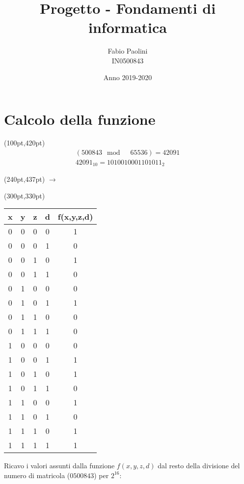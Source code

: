 \documentclass{article}
\newcommand{\bigspace}{\quad\quad\quad\quad}
\begin{document}
\author{Fabio Paolini\\ IN0500843}
\title{Progetto - Fondamenti di informatica}
\date{Anno 2019-2020}
\maketitle
\section{Calcolo della funzione}
\begin{textblock*}{10pt}(100pt,420pt)
\begin{gather*}
(500843 \mod \quad 65536) = 42091\\
42091_{10} = 1010010001101011_2
\end{gather*}
\end{textblock*}
\begin{textblock*}{10pt}(240pt,437pt)
\Huge{$\rightarrow$}
\end{textblock*}
\begin{textblock*}{10pt}(300pt,330pt)
\begin{tabular}{|c|c|c|c|c|}
\hline
\textbf{x} & \textbf{y} & \textbf{z} & \textbf{d} & \textbf{f(x,y,z,d)} \\
\hline
0 & 0 & 0 & 0 & 1 \\
\hline
0 & 0 & 0 & 1 & 0 \\
\hline
0 & 0 & 1 & 0 & 1 \\
\hline
0 & 0 & 1 & 1 & 0 \\
\hline
0 & 1 & 0 & 0 & 0 \\
\hline
0 & 1 & 0 & 1 & 1 \\
\hline
0 & 1 & 1 & 0 & 0 \\
\hline
0 & 1 & 1 & 1 & 0 \\
\hline
1 & 0 & 0 & 0 & 0 \\
\hline
1 & 0 & 0 & 1 & 1 \\
\hline
1 & 0 & 1 & 0 & 1 \\
\hline
1 & 0 & 1 & 1 & 0 \\
\hline
1 & 1 & 0 & 0 & 1 \\
\hline
1 & 1 & 0 & 1 & 0 \\
\hline
1 & 1 & 1 & 0 & 1 \\
\hline
1 & 1 & 1 & 1 & 1 \\
\hline
\end{tabular}
\end{textblock*}
Ricavo i valori assunti dalla funzione $f(x,y,z,d)$ dal resto della divisione del numero di matricola ($0500843$) per $2^{16}$:\\
\bigspace
\newpage
\end{document}
